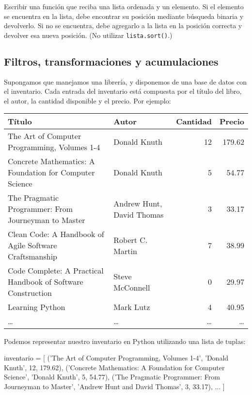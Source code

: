 \begin{ejercicio}
Escribir una función que reciba una lista ordenada y un elemento. Si el
elemento se encuentra en la lista, debe encontrar su posición mediante
búsqueda binaria y devolverlo.  Si no se encuentra, debe agregarlo a la
lista en la posición correcta y devolver esa nueva posición. (No utilizar
\verb!lista.sort()!.)
\end{ejercicio}


\newpage
\begin{subappendices}
\section{Filtros, transformaciones y acumulaciones}

Supongamos que manejamos una librería, y disponemos de una base de datos con el
inventario. Cada entrada del inventario está compuesta por el título del libro,
el autor, la cantidad disponible y el precio. Por ejemplo:

\begin{center}
\small
{}
\begin{tabular}{p{8cm} p{3cm} r r}
{\bf Título} & {\bf Autor} & {\bf Cantidad} & {\bf Precio} \\
\hline
The Art of Computer Programming, Volumes 1-4 & Donald Knuth & 12 & 179.62 \\
Concrete Mathematics: A Foundation for Computer Science & Donald Knuth & 5 & 54.77 \\
The Pragmatic Programmer: From Journeyman to Master & Andrew Hunt, David Thomas & 3 & 33.17 \\
Clean Code: A Handbook of Agile Software Craftsmanship & Robert C. Martin & 7 & 38.99 \\
Code Complete: A Practical Handbook of Software Construction & Steve McConnell & 0 & 29.97 \\
Learning Python & Mark Lutz & 4 & 40.95 \\
\ldots & \ldots & \ldots & \ldots \\ \hline
\end{tabular}
\end{center}

Podemos representar nuestro inventario en Python utilizando una lista de
tuplas:

\begin{codigo-python-sn}
inventario = [
    ('The Art of Computer Programming, Volumes 1-4',
     'Donald Knuth', 12, 179.62),
    ('Concrete Mathematics: A Foundation for Computer Science',
     'Donald Knuth', 5, 54.77),
    ('The Pragmatic Programmer: From Journeyman to Master',
     'Andrew Hunt and David Thomas', 3, 33.17),
    ...
]
\end{codigo-python-sn}


\end{subappendices}
